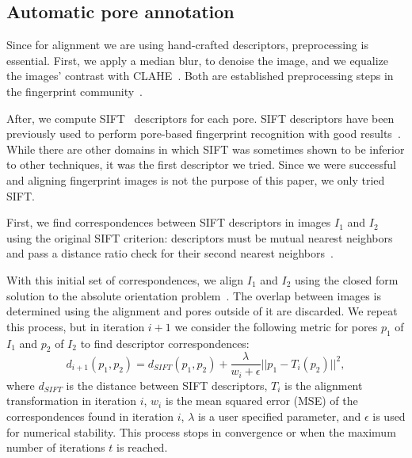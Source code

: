 \documentclass[10pt,twocolumn,letterpaper]{article}
\begin{document}
\subsection{Automatic pore annotation}
\label{sec:alignment}

Since for alignment we are using hand-crafted descriptors, preprocessing is essential.
First, we apply a median blur, to denoise the image, and we equalize the images' contrast with CLAHE~\cite{clahe}.
Both are established preprocessing steps in the fingerprint community~\cite{ridge-reconstruction}. %


After, we compute SIFT~\cite{sift} descriptors for each pore.
SIFT descriptors have been previously used to perform pore-based fingerprint recognition with good results~\cite{ridge-reconstruction}.
While there are other domains in which SIFT was sometimes shown to be inferior to other techniques, it was the first descriptor we tried.
Since we were successful and aligning fingerprint images is not the purpose of this paper, we only tried SIFT.

First, we find correspondences between SIFT descriptors in images $I_1$ and $I_2$ using the original SIFT criterion: descriptors must be mutual nearest neighbors and pass a distance ratio check for their second nearest neighbors~\cite{sift}.

With this initial set of correspondences, we align $I_1$ and $I_2$ using the closed form solution to the absolute orientation problem~\cite{horn}.
The overlap between images is determined using the alignment and pores outside of it are discarded.
We repeat this process, but in iteration ${i + 1}$ we consider the following metric for pores $p_1$ of $I_1$ and $p_2$ of $I_2$ to find descriptor correspondences:
\begin{equation}
  \label{eq:alignment}
  d_{i + 1}(p_1, p_2) = d_{\mathit{SIFT}}(p_1, p_2) + \frac{\lambda}{w_i + \epsilon} ||p_1 - T_i(p_2)||^2,
\end{equation}
where $d_\mathit{SIFT}$ is the distance between SIFT descriptors, $T_i$ is the alignment transformation in iteration $i$, $w_i$ is the mean squared error (MSE) of the correspondences found in iteration $i$,  $\lambda$ is a user specified parameter, and $\epsilon$ is used for numerical stability.
This process stops in convergence or when the maximum number of iterations $t$ is reached.
\end{document}
